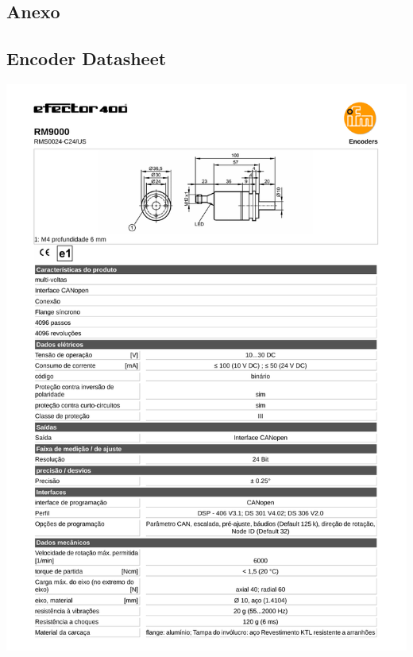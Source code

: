 

\begin{appendices}
\section{Anexo}
\subsection{Encoder Datasheet}
\includegraphics[width=1\columnwidth]{figs/datasheets/rm9000.pdf}


\end{appendices}
